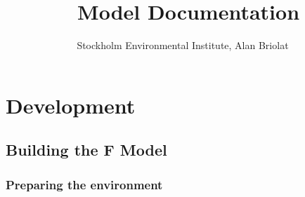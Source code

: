 \documentclass[10pt,a4paper]{article}
\title{\dose\ Model Documentation}
\author{Stockholm Environmental Institute, Alan Briolat}
\date{}
\begin{document}
\maketitle

\section{Development}



\subsection{Building the F Model}

\subsubsection*{Preparing the environment}
\end{document}
